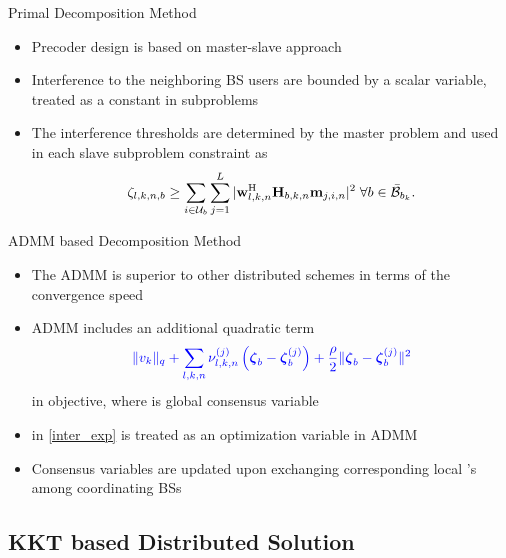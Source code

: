 \documentclass[9pt]{beamer}
\begin{document}
\begin{frame}{Primal Decomposition Method}
	\begin{itemize}
		\item Precoder design is based on master-slave approach
		\item Interference to the neighboring \ac{BS} users are \alert{bounded by a scalar variable, treated as a constant in subproblems}
		\item The interference thresholds are determined by the master problem and used in each slave subproblem constraint as
		\begin{equation} \label{inter_exp} \scriptsize
		\zeta_{l,k,n,b} \geq \sum_{i \in \mathcal{U}_b} \sum_{j = 1}^L |\mathbf{w}_{l,k,n}^{\mathrm{H}} \mathbf{H}_{b,k,n} \mathbf{m}_{j,i,n} |^2 \; \forall b \in \bar{\mathcal{B}}_{b_k}.
		\end{equation}
	\end{itemize}
\end{frame}

\begin{frame}{ADMM based Decomposition Method}
	\begin{itemize}
		\item The \ac{ADMM} is superior to other distributed schemes in terms of the convergence speed
		\item \ac{ADMM} includes an additional quadratic term 
		\begin{equation}
		\color{blue} \|v_k\|_q + \sum_{l,k,n} \nu_{l,k,n}^{(j)} \left ( {\boldsymbol{\zeta}}_b - {\boldsymbol{\zeta}}^{(j)}_b \right ) + \frac{\rho}{2}  \| {\boldsymbol{\zeta}}_b - {\boldsymbol{\zeta}}^{(j)}_b \|^2
		\end{equation}
		in objective, where  is global consensus variable
		\item {} in \eqref{inter_exp} is \alert{treated as an optimization variable in \ac{ADMM}}
		\item Consensus variables are updated upon exchanging corresponding local 's among coordinating \acp{BS}
	\end{itemize}
\end{frame}

\subsection{KKT based Distributed Solution}
\end{document}
